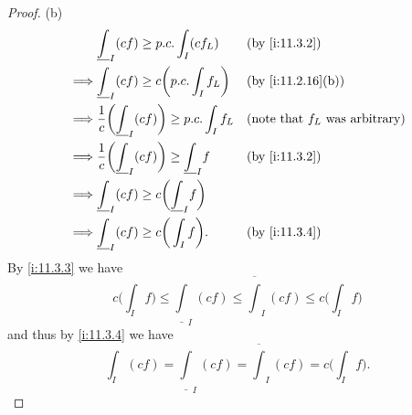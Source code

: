 \begin{proof}{(b)}
\begin{align*}
             & \underline{\int}_I (cf) \geq p.c. \int_I (c f_L)                           &  & \by{i:11.3.2}                            \\
    \implies & \underline{\int}_I (cf) \geq c \bigg(p.c. \int_I f_L\bigg)                 &  & \by{i:11.2.16}[b]                        \\
    \implies & \dfrac{1}{c} \bigg(\underline{\int}_I (cf)\bigg) \geq p.c. \int_I f_L      &  & \text{(note that \(f_L\) was arbitrary)} \\
    \implies & \dfrac{1}{c} \bigg(\underline{\int}_I (cf)\bigg) \geq \underline{\int}_I f &  & \by{i:11.3.2}                            \\
    \implies & \underline{\int}_I (cf) \geq c\bigg(\underline{\int}_I f\bigg)                                                           \\
    \implies & \underline{\int}_I (cf) \geq c\bigg(\int_I f\bigg).                        &  & \by{i:11.3.4}
  \end{align*}
  By \cref{i:11.3.3} we have
  \[
    c\bigg(\int_I f\bigg) \leq \underline{\int}_I (cf) \leq \overline{\int}_I (cf) \leq c\bigg(\int_I f\bigg)
  \]
  and thus by \cref{i:11.3.4} we have
  \[
    \int_I (cf) = \underline{\int}_I (cf) = \overline{\int}_I (cf) = c\bigg(\int_I f\bigg).
  \]


\end{proof}
